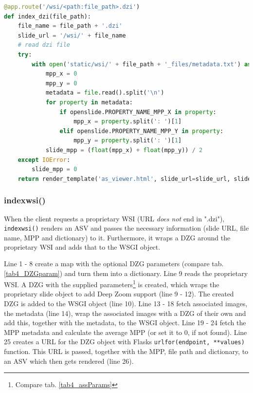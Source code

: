 \begin{lstlisting}[language=Python, frame=single]
@app.route('/wsi/<path:file_path>.dzi')
def index_dzi(file_path):
	file_name = file_path + '.dzi'
	slide_url = '/wsi/' + file_name
	# read dzi file
	try:
		with open('static/wsi/' + file_path + '_files/metadata.txt') as file:
			mpp_x = 0
			mpp_y = 0
			metadata = file.read().split('\n')
			for property in metadata:
				if openslide.PROPERTY_NAME_MPP_X in property:
					mpp_x = property.split(': ')[1]
				elif openslide.PROPERTY_NAME_MPP_Y in property:
					mpp_y = property.split(': ')[1]
			slide_mpp = (float(mpp_x) + float(mpp_y)) / 2
	except IOError:
		slide_mpp = 0
	return render_template('as_viewer.html', slide_url=slide_url, slide_mpp=slide_mpp, file_name=file_name, dictionary=getDictionary(file_name))
\end{lstlisting}


\subsubsection{index{\textunderscore}wsi()}
When the client requests a proprietary WSI (URL \emph{does not} end in ".dzi"), \texttt{index{\textunderscore}wsi()} renders an ASV and passes the necessary information (slide URL, file name, MPP and dictionary) to it. Furthermore, it wraps a DZG around the proprietary WSI and adds that to the WSGI object.

Line 1 - 8 create a map with the optional DZG parameters (compare tab. \ref{tab4_DZGparam}) and turn them into a dictionary. Line 9 reads the proprietary WSI. A DZG with the supplied parameters\footnote{Compare tab. \ref{tab4_assParams}} is created, which wraps the proprietary slide object to add Deep Zoom support (line 9 - 12). The created DZG is added to the WSGI object (line 10). Line 13 - 18 fetch associated images, the metadata (line 14), wrap the associated images with a DZG of their own and add this, together with the metadata, to the WSGI object. Line 19 - 24 fetch the MPP metadata and calculate the average MPP (or set it to 0, if not found). 
Line 25 creates a URL for the DZG object with Flasks \texttt{url{\textunderscore}for(endpoint, **values)} function. This URL is passed, together with the MPP, file path and dictionary, to an ASV which then gets rendered (line 26).

